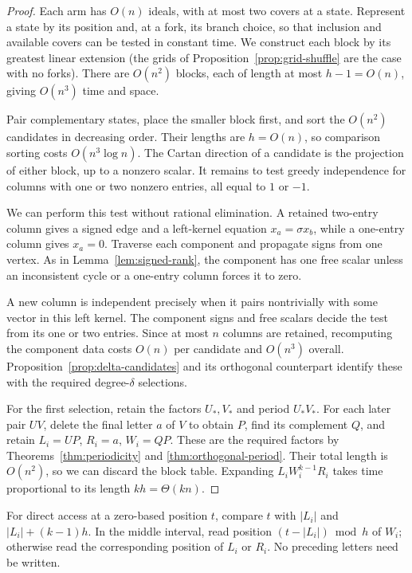 \documentclass[11pt]{amsart}
\numberwithin{equation}{section}
\theoremstyle{definition}
\begin{document}
\begin{proof}
Each arm has $O(n)$ ideals, with at most two covers at a state. Represent a state by its position and, at a fork, its branch choice, so that inclusion and available covers can be tested in constant time. We construct each block by its greatest linear extension (the grids of Proposition~\ref{prop:grid-shuffle} are the case with no forks). There are $O(n^2)$ blocks, each of length at most $h-1=O(n)$, giving $O(n^3)$ time and space.

Pair complementary states, place the smaller block first, and sort the $O(n^2)$ candidates in decreasing order. Their lengths are $h=O(n)$, so comparison sorting costs $O(n^3\log n)$. The Cartan direction of a candidate is the projection of either block, up to a nonzero scalar. It remains to test greedy independence for columns with one or two nonzero entries, all equal to $1$ or $-1$.

We can perform this test without rational elimination. A retained two-entry column gives a signed edge and a left-kernel equation $x_a=\sigma x_b$, while a one-entry column gives $x_a=0$. Traverse each component and propagate signs from one vertex. As in Lemma~\ref{lem:signed-rank}, the component has one free scalar unless an inconsistent cycle or a one-entry column forces it to zero.

A new column is independent precisely when it pairs nontrivially with some vector in this left kernel. The component signs and free scalars decide the test from its one or two entries. Since at most $n$ columns are retained, recomputing the component data costs $O(n)$ per candidate and $O(n^3)$ overall. Proposition~\ref{prop:delta-candidates} and its orthogonal counterpart identify these with the required degree-$\delta$ selections.

For the first selection, retain the factors $U_*,V_*$ and period $U_*V_*$. For each later pair $UV$, delete the final letter $a$ of $V$ to obtain $P$, find its complement $Q$, and retain $L_i=UP$, $R_i=a$, $W_i=QP$. These are the required factors by Theorems~\ref{thm:periodicity} and \ref{thm:orthogonal-period}. Their total length is $O(n^2)$, so we can discard the block table. Expanding $L_iW_i^{k-1}R_i$ takes time proportional to its length $kh=\Theta(kn)$.
\end{proof}

For direct access at a zero-based position $t$, compare $t$ with $|L_i|$ and $|L_i|+(k-1)h$. In the middle interval, read position $(t-|L_i|)\bmod h$ of $W_i$; otherwise read the corresponding position of $L_i$ or $R_i$. No preceding letters need be written.
\end{document}
